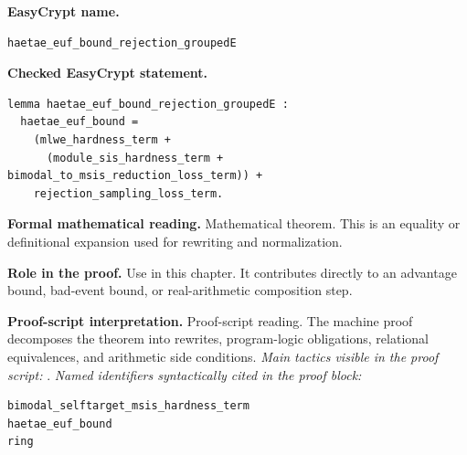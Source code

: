 \begin{formaltheorem}
\noindent\textbf{EasyCrypt name.}
\begin{lstlisting}[language=EasyCrypt,basicstyle=\ttfamily\scriptsize]
haetae_euf_bound_rejection_groupedE
\end{lstlisting}
\noindent\textbf{Checked EasyCrypt statement.}
\begin{lstlisting}[language=EasyCrypt,basicstyle=\ttfamily\scriptsize]
lemma haetae_euf_bound_rejection_groupedE :
  haetae_euf_bound =
    (mlwe_hardness_term +
      (module_sis_hardness_term + bimodal_to_msis_reduction_loss_term)) +
    rejection_sampling_loss_term.
\end{lstlisting}
\noindent\textbf{Formal mathematical reading.}
Mathematical theorem. This is an equality or definitional expansion used for rewriting and normalization.

\noindent\textbf{Role in the proof.}
Use in this chapter. It contributes directly to an advantage bound, bad-event bound, or real-arithmetic composition step.

\noindent\textbf{Proof-script interpretation.}
Proof-script reading. The machine proof decomposes the theorem into rewrites, program-logic obligations, relational equivalences, and arithmetic side conditions.
\emph{Main tactics visible in the proof script:} .
\emph{Named identifiers syntactically cited in the proof block:}
\begin{lstlisting}[language=EasyCrypt,basicstyle=\ttfamily\scriptsize]
bimodal_selftarget_msis_hardness_term
haetae_euf_bound
ring
\end{lstlisting}

\end{formaltheorem}

